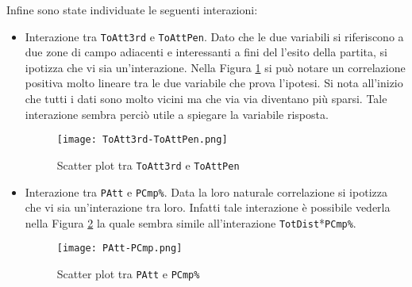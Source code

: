 Infine sono state individuate le seguenti interazioni:
\begin{itemize}
	\item Interazione tra \texttt{ToAtt3rd} e \texttt{ToAttPen}. Dato che le due variabili si riferiscono a due zone di campo adiacenti e interessanti a fini del l'esito della partita, si ipotizza che vi sia un'interazione. Nella Figura \ref{fig:toatt} si può notare un correlazione positiva molto lineare tra le due variabile che prova l'ipotesi. Si nota all'inizio che tutti i dati sono molto vicini ma che via via diventano più sparsi. Tale interazione sembra perciò utile a spiegare la variabile risposta.
	\begin{figure}[htbp]
		\begin{center}
			\texttt{[image: ToAtt3rd-ToAttPen.png]}
			\caption{Scatter plot tra \texttt{ToAtt3rd} e \texttt{ToAttPen}}  \label{fig:toatt}
		\end{center}
	\end{figure}
	\item Interazione tra \texttt{PAtt} e \texttt{PCmp\%}. Data la loro naturale correlazione si ipotizza che vi sia un'interazione tra loro. Infatti tale interazione è possibile vederla nella Figura \ref{fig:pp} la quale sembra simile all'interazione \texttt{TotDist}*\texttt{PCmp\%}.
	\begin{figure}[htbp]
		\begin{center}
			\texttt{[image: PAtt-PCmp.png]}
			\caption{Scatter plot tra \texttt{PAtt} e \texttt{PCmp\%}}  \label{fig:pp}
		\end{center}
	\end{figure}

\end{itemize}

